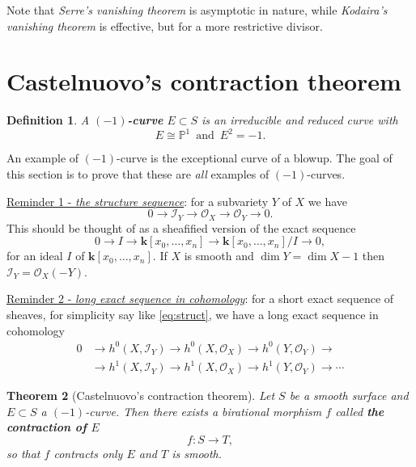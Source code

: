 \documentclass[a4paper,11pt]{amsart}
\newtheorem{theorem}{Theorem}[section]
\newtheorem{definition}[theorem]{Definition}
\def\dim{\operatorname{dim}}
\newcommand{\OO}{\mathcal{O}}
\newcommand{\II}{\mathcal{I}}
\newcommand{\PP}{\mathbb{P}}
\newcommand{\kk}{\textbf{k}}
\newcommand{\isom}{\cong}
\begin{document}
Note that \emph{Serre's vanishing theorem} is asymptotic in nature, while \emph{Kodaira's vanishing theorem} is effective, but for a more restrictive divisor.


\section{Castelnuovo's contraction theorem}\label{sec:Castelnuovo}


\begin{definition}
	A \textbf{$(-1)$-curve} $E \subset S$ is an irreducible and reduced curve with
	\[
	E \isom \PP^1 \, \text{ and } \, E^2 = -1.
	\]
\end{definition}

An example of $(-1)$-curve is the exceptional curve of a blowup.
The goal of this section is to prove that these are \emph{all} examples of $(-1)$-curves.

\vspace{.4cm}
\begin{minipage}{.8\textwidth}
\underline{Reminder 1 - \emph{the structure sequence}}: for a subvariety $Y$ of $X$ we have
\begin{equation}\label{eq:struct}\tag{$\dagger$}
	0 \to \II_Y \to \OO_X \to \OO_Y \to 0.
\end{equation}
This should be thought of as a sheafified version of the exact sequence
\[
0 \to I \to \kk[x_0,\dots,x_n] \to \kk[x_0,\dots,x_n]/I \to 0,
\]
for an ideal $I$ of $\kk[x_0,\dots,x_n]$.
If $X$ is smooth and $\dim Y = \dim X - 1$ then $\II_Y = \OO_X(-Y)$. 
\vspace{.2cm}

\underline{Reminder 2 - \emph{long exact sequence in cohomology}}: for a short exact sequence of sheaves, for simplicity say like \eqref{eq:struct}, we have a long exact sequence in cohomology
\begin{align*}
	0	&\to h^0(X,\II_Y) \to h^0(X,\OO_X) \to h^0(Y,\OO_Y) \to \\
		&\to h^1(X,\II_Y) \to h^1(X,\OO_X) \to h^1(Y,\OO_Y) \to \cdots
\end{align*}
\end{minipage}
\vspace{.4cm}



\begin{theorem}[{Castelnuovo's contraction theorem}]\label{thm:Castelnuovo}
	Let $S$ be a smooth surface and $E \subset S$ a $(-1)$-curve.
	Then there exists a birational morphism $f$ called \textbf{the contraction of $E$}
	\[
	f \colon S \to T,
	\]
	so that $f$ contracts \emph{only} $E$ and $T$ is smooth.
\end{theorem}
\end{document}
